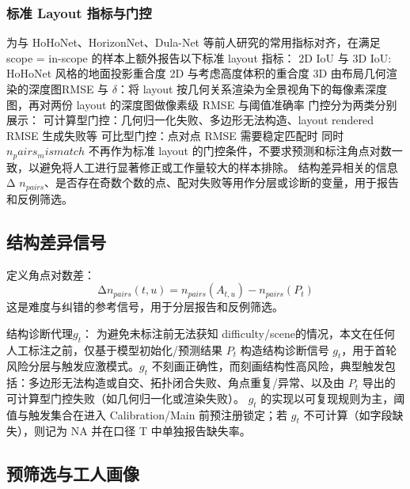 \documentclass[journal,onecolumn]{IEEEtran}
\begin{document}
\subsubsection{标准 Layout 指标与门控}
为与 HoHoNet、HorizonNet、Dula-Net 等前人研究的常用指标对齐，在满足 scope = in-scope 的样本上额外报告以下标准 layout 指标：
2D IoU 与 3D IoU: HoHoNet 风格的地面投影重合度 2D 与考虑高度体积的重合度 3D
由布局几何渲染的深度图RMSE 与 $\delta$：将 layout 按几何关系渲染为全景视角下的每像素深度图，再对两份 layout 的深度图做像素级 RMSE 与阈值准确率
门控分为两类分别展示：
可计算型门控：几何归一化失败、多边形无法构造、layout rendered RMSE 生成失败等
可比型门控：点对点 RMSE 需要稳定匹配时
同时 $n_pairs_mismatch$ 不再作为标准 layout 的门控条件，不要求预测和标注角点对数一致，以避免将人工进行显著修正或工作量较大的样本排除。
结构差异相关的信息 $\mathrm{\Delta}$ $n_{pairs}$、是否存在奇数个数的点、配对失败等用作分层或诊断的变量，用于报告和反例筛选。

\subsection{结构差异信号}

定义角点对数差：
\[\mathrm{\Delta} n_{pairs}\left(t,u\right)=n_{pairs}\left(A_{t,u}\right)-n_{pairs}\left(P_t\right)\]
这是难度与纠错的参考信号，用于分层报告和反例筛选。

结构诊断代理$g_t$：
为避免未标注前无法获知 difficulty/scene的情况，本文在任何人工标注之前，仅基于模型初始化/预测结果 $P_t$ 构造结构诊断信号 $g_t$，用于首轮风险分层与触发应激模式。$g_t$ 不刻画正确性，而刻画结构性高风险，典型触发包括：多边形无法构造或自交、拓扑闭合失败、角点重复/异常、以及由 $P_t$ 导出的可计算型门控失败（如几何归一化或渲染失败）。
$g_t$ 的实现以可复现规则为主，阈值与触发集合在进入 Calibration/Main 前预注册锁定；若 $g_t$ 不可计算（如字段缺失），则记为 NA 并在口径 T 中单独报告缺失率。
\subsection{预筛选与工人画像}
\end{document}
